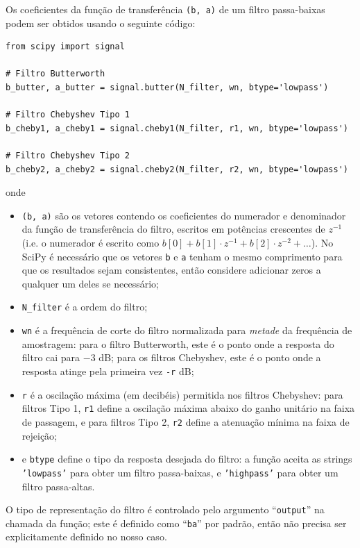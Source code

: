 \documentclass[a4paper,twoside,12pt]{article}
\begin{document}
	Os coeficientes da função de transferência {\tt (b, a)} de um filtro passa-baixas podem ser obtidos usando o seguinte código:
	
	\begin{lstlisting}[frame=single]
from scipy import signal

# Filtro Butterworth
b_butter, a_butter = signal.butter(N_filter, wn, btype='lowpass') 

# Filtro Chebyshev Tipo 1
b_cheby1, a_cheby1 = signal.cheby1(N_filter, r1, wn, btype='lowpass')

# Filtro Chebyshev Tipo 2
b_cheby2, a_cheby2 = signal.cheby2(N_filter, r2, wn, btype='lowpass')
	\end{lstlisting}
	
	onde
	
	\begin{itemize}
		\item {\tt (b, a)} são os vetores contendo os coeficientes do numerador e denominador da função de transferência do filtro, escritos em potências crescentes de $z^{-1}$ (i.e. o numerador é escrito como $b[0] + b[1] \cdot z^{-1} + b[2] \cdot z^{-2} + \ldots$). No SciPy é necessário que os vetores {\tt b} e {\tt a} tenham o mesmo comprimento para que os resultados sejam consistentes, então considere adicionar zeros a qualquer um deles se necessário;
		\item {\tt N\_filter} é a ordem do filtro;
		\item {\tt wn} é a frequência de corte do filtro normalizada para \emph{metade} da frequência de amostragem: para o filtro Butterworth, este é o ponto onde a resposta do filtro cai para $-3$ dB; para os filtros Chebyshev, este é o ponto onde a resposta atinge pela primeira vez {\tt -r} dB;
		\item {\tt r} é a oscilação máxima (em decibéis) permitida nos filtros Chebyshev: para filtros Tipo 1, {\tt r1} define a oscilação máxima abaixo do ganho unitário na faixa de passagem, e para filtros Tipo 2, {\tt r2} define a atenuação mínima na faixa de rejeição;
		\item e {\tt btype} define o tipo da resposta desejada do filtro: a função aceita as strings {\tt 'lowpass'} para obter um filtro passa-baixas, e {\tt 'highpass'} para obter um filtro passa-altas.
	\end{itemize}
	
	O tipo de representação do filtro é controlado pelo argumento ``{\tt output}'' na chamada da função; este é definido como ``{\tt ba}'' por padrão, então não precisa ser explicitamente definido no nosso caso.
	
\end{document}
